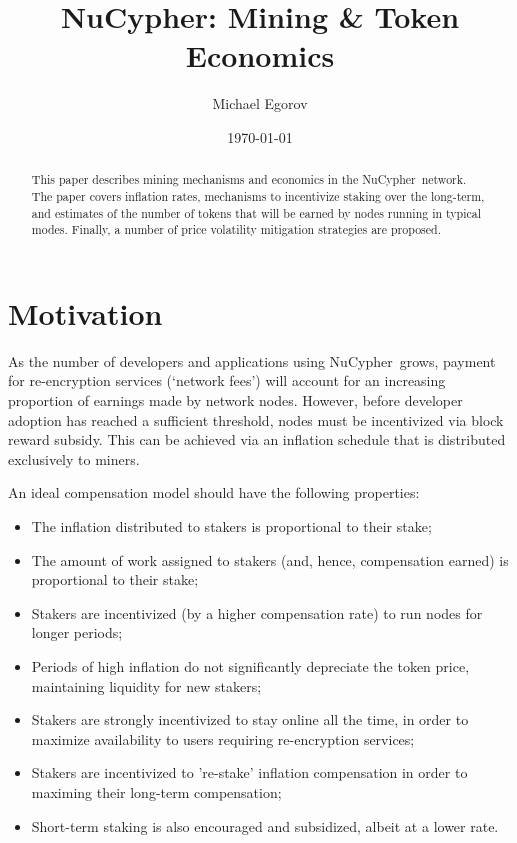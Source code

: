 \documentclass[longbibliography,nofootinbib,twocolumn]{revtex4-1}
\newcommand{\kms}{NuCypher}
\begin{document}
\title{\kms: Mining \& Token Economics}

\author{Michael Egorov}

\begin{abstract}
This paper describes mining mechanisms and economics in the \kms~network.
The paper covers inflation rates, mechanisms to incentivize staking over the long-term,
and estimates of the number of tokens that will be earned by nodes running in typical modes.
Finally, a number of price volatility mitigation strategies are proposed.
\end{abstract}

\date{\today}
\maketitle

\section{Motivation}

As the number of developers and applications using \kms~grows, payment for re-encryption services (`network fees') will account for an increasing proportion of earnings made by network nodes.
However, before developer adoption has reached a sufficient threshold, nodes must be incentivized via block reward subsidy.
This can be achieved via an inflation schedule that is distributed exclusively to miners.

An ideal compensation model should have the following properties:
\begin{itemize}
    \item The inflation distributed to stakers is proportional to their stake;
    \item The amount of work assigned to stakers (and, hence, compensation earned) is proportional to their stake;
    \item Stakers are incentivized (by a higher compensation rate) to run nodes for longer periods;
    \item Periods of high inflation do not significantly depreciate the token price, maintaining liquidity for new stakers;
    \item Stakers are strongly incentivized to stay online all the time, in order to maximize availability to users requiring re-encryption services;
    \item Stakers are incentivized to 're-stake' inflation compensation in order to maximing their long-term compensation;
    \item Short-term staking is also encouraged and subsidized, albeit at a lower rate.
\end{itemize}
\end{document}
